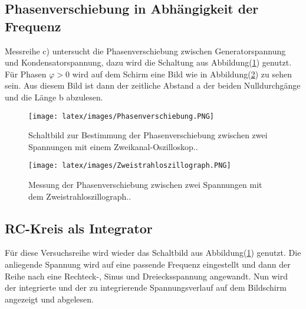     \subsection{Phasenverschiebung in Abhängigkeit der Frequenz}

        \noindent Messreihe c) untersucht die Phasenverschiebung zwischen Generatorspannung und Kondensatorspannung, dazu wird die Schaltung aus 
        Abbildung(\ref{img:Phase}) genutzt. Für Phasen $\varphi > 0$ wird auf dem Schirm eine Bild wie in Abbildung(\ref{img:Zweist}) zu sehen sein.
        Aus diesem Bild ist dann der zeitliche Abstand a der beiden Nulldurchgänge und die Länge b abzulesen.

        \begin{figure}
            \centering
            \texttt{[image: latex/images/Phasenverschiebung.PNG]}
            \caption{Schaltbild zur Bestimmung der Phasenverschiebung zwischen zwei Spannungen mit einem Zweikanal-Oszilloskop.\protect \cite{V353}.}
            \label{img:Phase}
        \end{figure}

        \begin{figure}
            \centering
            \texttt{[image: latex/images/Zweistrahloszillograph.PNG]}
            \caption{Messung der Phasenverschiebung zwischen zwei Spannungen mit dem Zweistrahloszillograph.\protect \cite{V353}.}
            \label{img:Zweist}
        \end{figure}

    \subsection{RC-Kreis als Integrator}

        \noindent Für diese Versuchsreihe wird wieder das Schaltbild aus Abbildung(\ref{img:Phase}) genutzt. Die anliegende Spannung wird auf 
        eine passende Frequenz eingestellt und dann der Reihe nach eine Rechteck-, Sinus und Dreiecksspannung angewandt. Nun wird der 
        integrierte und der zu integrierende Spannungsverlauf auf dem Bildschirm angezeigt und abgelesen.



        
        
